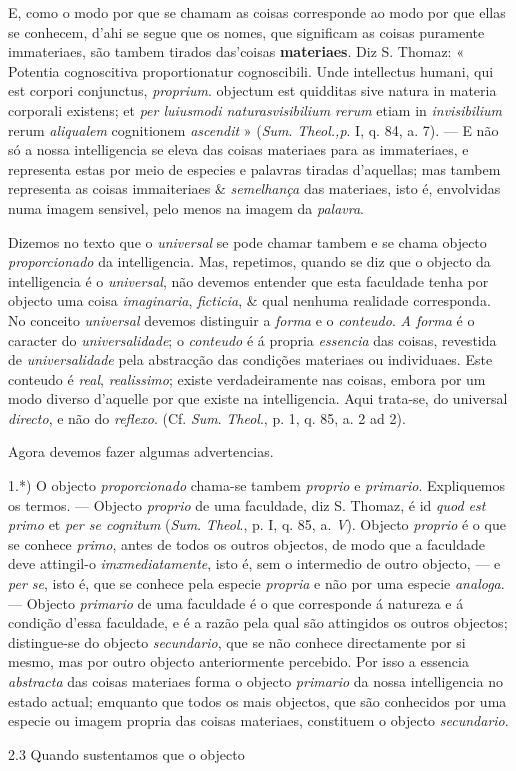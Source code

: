 E, como o modo por que se chamam as coisas corresponde ao modo por que ellas se conhecem, d'ahi se segue que os nomes, que significam as coisas puramente immateriaes, são tambem tirados das'coisas \textbf{materiaes}. Diz S. Thomaz: « Potentia cognoscitiva proportionatur cognoscibili. Unde intellectus humani, qui est corpori conjunctus, \emph{proprium}. objectum est quidditas sive natura in materia corporali existens; et \emph{per luiusmodi naturas}\emph{visibilium rerum} etiam in \emph{invisibilium} rerum \emph{aliqualem} cognitionem \emph{ascendit} » (\emph{Sum}. \emph{Theol.,p}. I, q. 84, a. 7). --- E não só a nossa intelligencia se eleva das coisas materiaes para as immateriaes, e representa estas por meio de especies e palavras tiradas d'aquellas; mas tambem representa as coisas immaiteriaes \& \emph{semelhança} das materiaes, isto é, envolvidas numa imagem sensivel, pelo menos na imagem da \emph{palavra}.\par Dizemos no texto que o \emph{universal} se pode chamar tambem e se chama objecto \emph{proporcionado} da intelligencia. Mas, repetimos, quando se diz que o objecto da intelligencia é o \emph{universal}, não devemos entender que esta faculdade tenha por objecto uma coisa \emph{imaginaria}, \emph{ficticia}, \& qual nenhuma realidade corresponda. No conceito \emph{universal} devemos distinguir a \emph{forma} e o \emph{conteudo}. \emph{A forma} é o caracter do \emph{universalidade}; o \emph{conteudo} é á propria \emph{essencia} das coisas, revestida de \emph{universalidade} pela abstracção das condições materiaes ou individuaes. Este conteudo é \emph{real}, \emph{realissimo}; existe verdadeiramente nas coisas, embora por um modo diverso d'aquelle por que existe na intelligencia. Aqui trata-se, do universal \emph{directo}, e não do \emph{reflexo}. (Cf. \emph{Sum}. \emph{Theol}., p. 1, q. 85, a. 2 ad 2).\par Agora devemos fazer algumas advertencias.\par 1.*) O objecto \emph{proporcionado} chama-se tambem \emph{proprio} e \emph{primario}. Expliquemos os termos. --- Objecto \emph{proprio} de uma faculdade, diz S. Thomaz, é id \emph{quod est primo} et \emph{per se cognitum} (\emph{Sum}. \emph{Theol}., p. I, q. 85, a. \emph{V}). Objecto \emph{proprio} é o que se conhece \emph{primo}, antes de todos os outros objectos, de modo que a faculdade deve attingil-o \emph{imxmediatamente}, isto é, sem o intermedio de outro objecto, --- e \emph{per se}, isto é, que se conhece pela especie \emph{propria} e não por uma especie \emph{analoga}. --- Objecto \emph{primario} de uma faculdade é o que corresponde á natureza e á condição d'essa faculdade, e é a razão pela qual são attingidos os outros objectos; distingue-se do objecto \emph{secundario}, que se não conhece directamente por si mesmo, mas por outro objecto anteriormente percebido. Por isso a essencia \emph{abstracta} das coisas materiaes forma o objecto \emph{primario} da nossa intelligencia no estado actual; emquanto que todos os mais objectos, que são conhecidos por uma especie ou imagem propria das coisas materiaes, constituem o objecto \emph{secundario}.\par 2.3 Quando sustentamos que o objecto 
